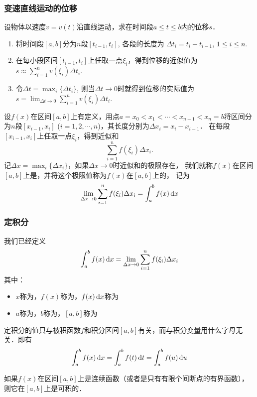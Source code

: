 \documentclass[14pt,notheorems,leqno,xcolor={rgb}]{beamer} %
\begin{document}
\begin{frame}[shrink=7]
\frametitle{变速直线运动的位移}
\begin{example}
设物体以速度$v=v(t)$沿直线运动，求在时间段$a\leq t \leq b$内的位移$s$．
\end{example}\pause
\begin{enumerate}
\item 将时间段$[a,b]$分为$n$段$[t_{i-1},t_i]$, 各段的长度为
  $\Delta t_i=t_i-t_{i-1}$, $1\leq i \leq n$.\pause
\item 在每小段区间$[t_{i-1},t_i]$上任取一点$\xi_i$，得到位移的近似值为
  $\displaystyle s\approx \sum_{i=1}^n v(\xi_i)\Delta t_i $.\pause
\item 令$\Delta t=\displaystyle\max_{i}\{\Delta t_i\}$, 则当$\Delta t\to0$时就得到位移的实际值为
  $\displaystyle s = \lim_{\Delta t\to0} \sum_{i=1}^n v(\xi_i)\Delta t_i $.
\end{enumerate}
\end{frame}

\begin{frame}%
\begin{definition}
设$f(x)$在区间$[a,b]$上有定义，用点$a=x_0<x_1<\cdots<x_{n-1}<x_n=b$将区间分为$n$段$[x_{i-1},x_i]$ ($i=1,2,\cdots,n$)，其长度分别为$\Delta x_i=x_i-x_{i-1}$．\pause
在每段$[x_{i-1},x_i]$上任取一点$\xi_i$，得到近似和$$\displaystyle\sum_{i=1}^n f(\xi_i)\Delta x_i.$$\pause
记$\Delta x=\displaystyle\max_i\{\Delta x_i\}$，如果$\Delta x \to 0$时近似和的极限存在，\pause
我们就称$f(x)$在区间$[a,b]$上是，并将这个极限值称为$f(x)$在$[a,b]$上的，\pause
记为
\[ \lim_{\Delta x\to 0} \sum_{i=1}^n f(\xi_i)\Delta x_i = \int_a^b f(x)\mathop{}\!\mathrm{d} x \]
\end{definition}
\end{frame}

\begin{frame}
\frametitle{定积分}
我们已经定义
\[ \int_a^b f(x)\mathop{}\!\mathrm{d} x  = \lim_{\Delta x\to 0} \sum_{i=1}^n f(\xi_i)\Delta x_i \]\pause
其中：\pause
\begin{itemize}[<+->]
\item $x$称为，$f(x)$称为，$f(x)\mathop{}\!\mathrm{d} x$称为
\item $a$称为，$b$称为，$[a,b]$称为
\end{itemize}
\end{frame}

\begin{frame}
\begin{remark}
定积分的值只与被积函数$f$和积分区间$[a,b]$有关，而与积分变量用什么字母无关．即有
\[ \int_a^b f(x)\mathop{}\!\mathrm{d} x = \int_a^b f(t)\mathop{}\!\mathrm{d} t = \int_a^b f(u)\mathop{}\!\mathrm{d} u \]
\end{remark}\pause
\begin{remark}
如果$f(x)$在区间$[a,b]$上是连续函数（或者是只有有限个间断点的有界函数），则它在$[a,b]$上是可积的．
\end{remark}
\end{frame}
\end{document}
